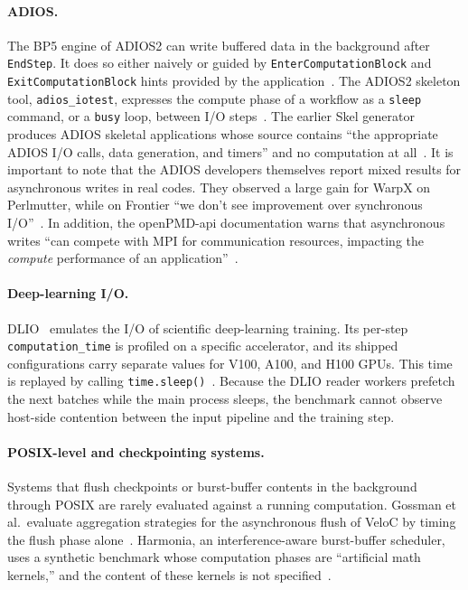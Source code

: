 \paragraph{ADIOS.} The BP5 engine of ADIOS2 can write buffered data in the
background after \texttt{EndStep}. It does so either naively or guided by
\texttt{EnterComputationBlock} and \texttt{ExitComputationBlock} hints
provided by the application~\cite{godoy2020adios2}. The ADIOS2 skeleton tool,
\texttt{adios\_iotest}, expresses the compute phase of a workflow as a
\texttt{sleep} command, or a \texttt{busy} loop, between I/O
steps~\cite{adios2_iotest}. The earlier Skel generator produces ADIOS
skeletal applications whose source contains ``the appropriate ADIOS I/O
calls, data generation, and timers'' and no computation at
all~\cite{logan2011skel}. It is important to note that the ADIOS developers
themselves report mixed results for asynchronous writes in real codes. They
observed a large gain for WarpX on Perlmutter, while on Frontier ``we don't
see improvement over synchronous I/O''~\cite{podhorszki2024adiosslides}. In
addition, the openPMD-api documentation warns that asynchronous writes ``can
compete with MPI for communication resources, impacting the \emph{compute}
performance of an application''~\cite{openpmd_adios2_docs}.

\paragraph{Deep-learning I/O.} DLIO~\cite{devarajan2021dlio} emulates the I/O
of scientific deep-learning training. Its per-step
\texttt{computation\_time} is profiled on a specific accelerator, and its
shipped configurations carry separate values for V100, A100, and H100 GPUs.
This time is replayed by calling \texttt{time.sleep()}~\cite{dlio_github}.
Because the DLIO reader workers prefetch the next batches while the main
process sleeps, the benchmark cannot observe host-side contention between the
input pipeline and the training step.

\paragraph{POSIX-level and checkpointing systems.} Systems that flush
checkpoints or burst-buffer contents in the background through POSIX are
rarely evaluated against a running computation. Gossman et al.\ evaluate
aggregation strategies for the asynchronous flush of VeloC by timing the
flush phase alone~\cite{gossman2021aggregated,nicolae2019veloc}. Harmonia,
an interference-aware burst-buffer scheduler, uses a synthetic benchmark
whose computation phases are ``artificial math kernels,'' and the content of
these kernels is not specified~\cite{kougkas2018harmonia}.

